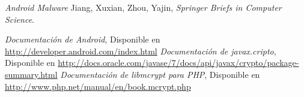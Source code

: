 \documentclass[10pt, a4paper,english,spanish]{article}
\begin{document}


\maketitle
\pagebreak

\tableofcontents
\pagebreak






\begin{thebibliography}{8}
\raggedright

	\textit{Android Malware}
	Jiang, Xuxian, Zhou, Yajin, \textit{Springer Briefs in Computer Science}.

	\textit{Documentaci\'on de Android},
	Disponible en \url{http://developer.android.com/index.html}
	\textit{Documentaci\'on de javax.cripto},
	Disponible en
	\url{http://docs.oracle.com/javase/7/docs/api/javax/crypto/package-summary.html}
	\textit{Documentaci\'on de libmcrypt para PHP},
	Disponible en 
	\url{http://www.php.net/manual/en/book.mcrypt.php}
 \end{thebibliography}
\end{document}
